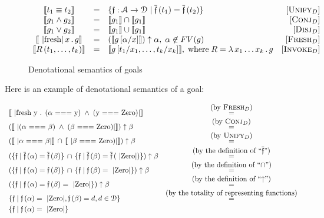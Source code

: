 \begin{figure}[t]
  \[
  \begin{array}{cclr}
    \sembr{t_1\equiv t_2}&=&\{\mathfrak f : \mathcal{A}\to\mathcal{D}\mid \overline{\mathfrak{f}}\,(t_1)=\overline{\mathfrak{f}}\,(t_2)\}& \ruleno{Unify$_D$}\\
    \sembr{g_1\wedge g_2}&=&\sembr{g_1}\cap\sembr{g_1}&\ruleno{Conj$_D$}\\
    \sembr{g_1\vee g_2}&=&\sembr{g_1}\cup\sembr{g_1}&\ruleno{Disj$_D$}\\
    \sembr{\mbox{\lstinline|fresh|}\,x\,.\,g}&=&(\sembr{g\,[\alpha/x]})\uparrow\alpha,\;\alpha\not\in FV(g)& \ruleno{Fresh$_D$}\\
    \sembr{R\,(t_1,\dots,t_k)}&=&\sembr{g\,[t_1/x_1,\dots,t_k/x_k]},\;\mbox{where}\;R=\lambda\,x_1\dots x_k\,.\,g & \ruleno{Invoke$_D$}
  \end{array}
  \]
  \caption{Denotational semantics of goals}
  \label{denotational_semantics_of_goals}
\end{figure}

Here is an example of denotational semantics of a goal:

\[
\begin{array}{lc}
  \sembr{\mbox{\lstinline|fresh y . ($\alpha$ === y) $\,\wedge\,$ (y === Zero)|}}&\overset{\mbox{(by \textsc{Fresh$_D$})}}{=}\\
  (\sembr{\mbox{\lstinline|($\alpha$ === $\beta$) $\,\wedge\,$ ($\beta$ === Zero)|}})\uparrow\beta&\overset{\mbox{(by \textsc{Conj$_D$})}}{=}\\
  (\sembr{\mbox{\lstinline|$\alpha$ === $\beta$|}} \,\cap\, \sembr{\mbox{\lstinline|$\beta$ === Zero)|}})\uparrow\beta&\overset{\mbox{(by \textsc{Unify$_D$})}}{=}\\
  (\{\mathfrak{f}\mid \overline{\mathfrak{f}}\,(\alpha)=\overline{\mathfrak{f}}\,(\beta)\} \,\cap\, \{\mathfrak{f}\mid \overline{\mathfrak{f}}\,(\beta)=\overline{\mathfrak{f}}\,(\mbox{\lstinline|Zero|})\})\uparrow\beta&\overset{\mbox{(by the definition of ``$\overline{\mathfrak{f}}$'')}}{=}\\
  (\{\mathfrak{f}\mid \mathfrak{f}\,(\alpha)=\mathfrak{f}\,(\beta)\} \,\cap\, \{\mathfrak{f}\mid \mathfrak{f}\,(\beta)=\mbox{\lstinline|Zero|}\})\uparrow\beta&\overset{\mbox{(by the definition of ``$\cap$'')}}{=}\\
  (\{\mathfrak{f}\mid \mathfrak{f}\,(\alpha)=\mathfrak{f}\,(\beta)=\mbox{\lstinline|Zero|}\})\uparrow\beta&\overset{\mbox{(by the definition of ``$\uparrow$'')}}{=}\\
  \{\mathfrak{f}\mid \mathfrak{f}\,(\alpha)=\mbox{\lstinline|Zero|}, \mathfrak{f}\,(\beta)=d, d\in\mathcal{D}\}&\overset{\mbox{(by the totality of representing functions)}}{=}\\[1mm]
  \{\mathfrak{f}\mid \mathfrak{f}\,(\alpha)=\mbox{\lstinline|Zero|}\}&
\end{array}
\]

